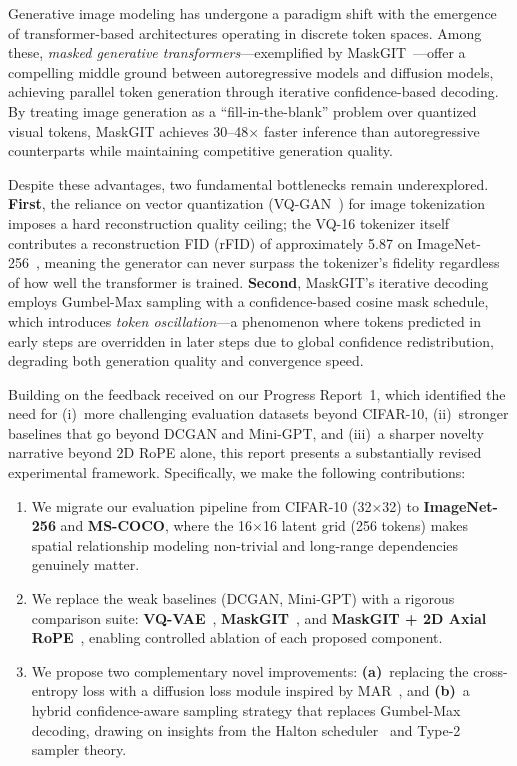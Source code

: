 \documentclass[conference]{IEEEtran}
\begin{document}
Generative image modeling has undergone a paradigm shift with the emergence of transformer-based architectures operating in discrete token spaces. Among these, \textit{masked generative transformers}---exemplified by MaskGIT~\cite{chang2022maskgit}---offer a compelling middle ground between autoregressive models and diffusion models, achieving parallel token generation through iterative confidence-based decoding. By treating image generation as a ``fill-in-the-blank'' problem over quantized visual tokens, MaskGIT achieves 30--48$\times$ faster inference than autoregressive counterparts while maintaining competitive generation quality.

Despite these advantages, two fundamental bottlenecks remain underexplored. \textbf{First}, the reliance on vector quantization (VQ-GAN~\cite{esser2021taming}) for image tokenization imposes a hard reconstruction quality ceiling; the VQ-16 tokenizer itself contributes a reconstruction FID (rFID) of approximately 5.87 on ImageNet-256~\cite{li2024mar}, meaning the generator can never surpass the tokenizer's fidelity regardless of how well the transformer is trained. \textbf{Second}, MaskGIT's iterative decoding employs Gumbel-Max sampling with a confidence-based cosine mask schedule, which introduces \textit{token oscillation}---a phenomenon where tokens predicted in early steps are overridden in later steps due to global confidence redistribution, degrading both generation quality and convergence speed.

Building on the feedback received on our Progress Report~1, which identified the need for (i)~more challenging evaluation datasets beyond CIFAR-10, (ii)~stronger baselines that go beyond DCGAN and Mini-GPT, and (iii)~a sharper novelty narrative beyond 2D RoPE alone, this report presents a substantially revised experimental framework. Specifically, we make the following contributions:

\begin{enumerate}
\item We migrate our evaluation pipeline from CIFAR-10 (32$\times$32) to \textbf{ImageNet-256} and \textbf{MS-COCO}, where the 16$\times$16 latent grid (256 tokens) makes spatial relationship modeling non-trivial and long-range dependencies genuinely matter.
\item We replace the weak baselines (DCGAN, Mini-GPT) with a rigorous comparison suite: \textbf{VQ-VAE}~\cite{oord2017neural}, \textbf{MaskGIT}~\cite{chang2022maskgit}, and \textbf{MaskGIT + 2D Axial RoPE}~\cite{su2021roformer}, enabling controlled ablation of each proposed component.
\item We propose two complementary novel improvements: \textbf{(a)}~replacing the cross-entropy loss with a diffusion loss module inspired by MAR~\cite{li2024mar}, and \textbf{(b)}~a hybrid confidence-aware sampling strategy that replaces Gumbel-Max decoding, drawing on insights from the Halton scheduler~\cite{besnier2025halton} and Type-2 sampler theory.
\end{enumerate}
\end{document}
